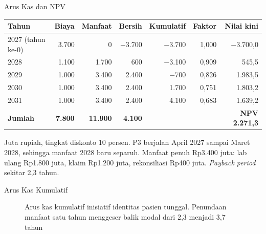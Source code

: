 \documentclass[aspectratio=169, table, 12pt]{beamer}
\begin{document}
\begin{frame}{{\Large Arus Kas dan NPV}}
  \footnotesize
  \begin{tabularx}{\textwidth}{Xrrrrrr}
    \hline
    \textbf{Tahun} & \textbf{Biaya} & \textbf{Manfaat} & \textbf{Bersih} &
      \textbf{Kumulatif} & \textbf{Faktor} & \textbf{Nilai kini} \\
    \hline
    2027 (tahun ke-0) & 3.700 & 0 & $-$3.700 & $-$3.700 & 1,000 & $-$3.700,0 \\
    \hline
    2028 & 1.100 & 1.700 & 600 & $-$3.100 & 0,909 & 545,5 \\
    \hline
    2029 & 1.000 & 3.400 & 2.400 & $-$700 & 0,826 & 1.983,5 \\
    \hline
    2030 & 1.000 & 3.400 & 2.400 & 1.700 & 0,751 & 1.803,2 \\
    \hline
    2031 & 1.000 & 3.400 & 2.400 & 4.100 & 0,683 & 1.639,2 \\
    \hline
    \textbf{Jumlah} & \textbf{7.800} & \textbf{11.900} & \textbf{4.100} & & & \textbf{NPV 2.271,3} \\
    \hline
  \end{tabularx}

  \vspace{6pt}
  \small Juta rupiah, tingkat diskonto 10 persen. P3 berjalan April 2027 sampai Maret 2028, sehingga
  manfaat 2028 baru separuh. Manfaat penuh Rp3.400 juta: lab ulang Rp1.800 juta, klaim Rp1.200 juta,
  rekonsiliasi Rp400 juta. \textit{Payback period} sekitar 2,3 tahun.
\end{frame}

\begin{frame}{{\Large Arus Kas Kumulatif}}
  \centering
  \begin{figure}
    \resizebox{0.70\textwidth}{!}{}
    \caption{Arus kas kumulatif inisiatif identitas pasien tunggal. Penundaan manfaat satu tahun
             menggeser balik modal dari 2,3 menjadi 3,7 tahun}
  \end{figure}
\end{frame}
\end{document}

